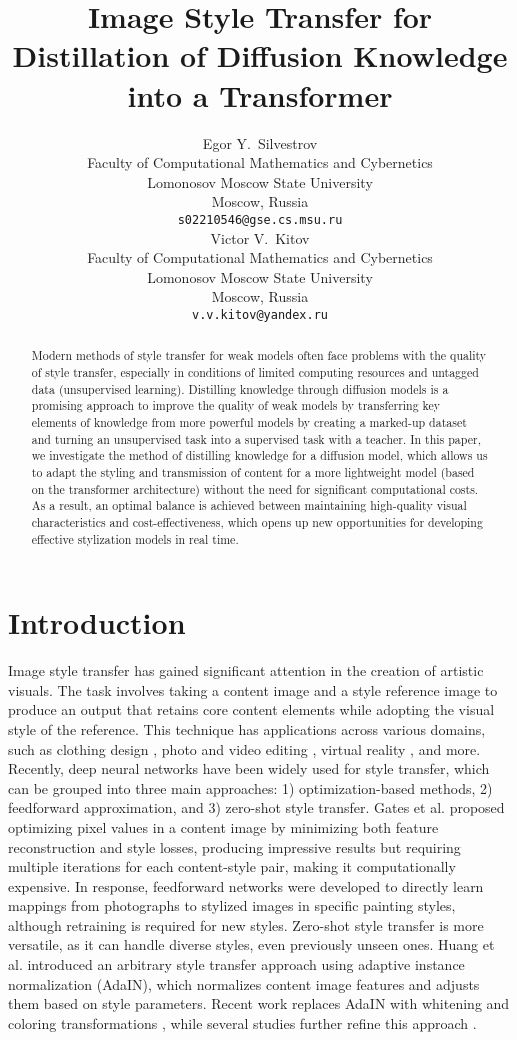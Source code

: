 \documentclass{article}
\title{Image Style Transfer for Distillation of Diffusion Knowledge into a Transformer}
\author{ Egor Y.~Silvestrov \\
	Faculty of Computational Mathematics and Cybernetics \\
	Lomonosov Moscow State University \\
	Moscow, Russia \\
	\texttt{s02210546@gse.cs.msu.ru} \\
	\And
        Victor V.~Kitov \\
	Faculty of Computational Mathematics and Cybernetics \\
	Lomonosov Moscow State University \\
	Moscow, Russia \\
	\texttt{v.v.kitov@yandex.ru} \\
}
\date{}
\begin{document}
\maketitle

\begin{abstract}
	Modern methods of style transfer for weak models often face problems with the quality of style transfer, especially in conditions of limited computing resources and untagged data (unsupervised learning). Distilling knowledge through diffusion models is a promising approach to improve the quality of weak models by transferring key elements of knowledge from more powerful models by creating a marked-up dataset and turning an unsupervised task into a supervised task with a teacher. In this paper, we investigate the method of distilling knowledge for a diffusion model, which allows us to adapt the styling and transmission of content for a more lightweight model (based on the transformer architecture) without the need for significant computational costs. As a result, an optimal balance is achieved between maintaining high-quality visual characteristics and cost-effectiveness, which opens up new opportunities for developing effective stylization models in real time.
\end{abstract}



\section{Introduction}
    Image style transfer has gained significant attention in the creation of artistic visuals. The task involves taking a content image and a style reference image to produce an output that retains core content elements while adopting the visual style of the reference. This technique has applications across various domains, such as clothing design \cite{method 6}, photo and video editing \cite{method 7, method 8}, virtual reality \cite{method 9}, and more. Recently, deep neural networks have been widely used for style transfer, which can be grouped into three main approaches: 1) optimization-based methods, 2) feedforward approximation, and 3) zero-shot style transfer. Gates et al. \cite{method 10} proposed optimizing pixel values in a content image by minimizing both feature reconstruction and style losses, producing impressive results but requiring multiple iterations for each content-style pair, making it computationally expensive. In response, feedforward networks \cite{method 11, method 12, method 13} were developed to directly learn mappings from photographs to stylized images in specific painting styles, although retraining is required for new styles. Zero-shot style transfer is more versatile, as it can handle diverse styles, even previously unseen ones. Huang et al. \cite{method 14} introduced an arbitrary style transfer approach using adaptive instance normalization (AdaIN), which normalizes content image features and adjusts them based on style parameters. Recent work replaces AdaIN with whitening and coloring transformations \cite{method 15}, while several studies further refine this approach \cite{method 16, method 17}.
    
\end{document}
